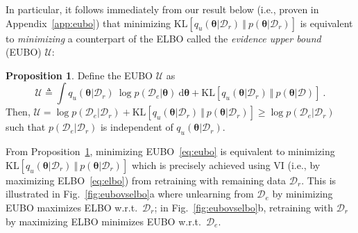 \documentclass{article}
\theoremstyle{definition}
\newtheorem{proposition}{Proposition}
\newcommand{\mbf}[1]{\mathbf{#1}}
\newcommand{\mcl}[1]{\mathcal{#1}}
\newcommand{\mbb}[1]{\mathbb{#1}}
\newcommand{\da}{\mcl{D}}
\newcommand{\dc}{\mcl{D}_r}
\newcommand{\dr}{\mcl{D}_e}
\begin{document}
In particular, it follows immediately from our result below (i.e., proven in Appendix~\ref{app:eubo}) that
minimizing $\text{KL}[q_u(\bm{\theta}|\dc)\ \Vert\ p(\bm{\theta}|\dc)]$ is equivalent to \emph{minimizing} a counterpart of the ELBO called the \emph{evidence upper bound} (EUBO) $\mcl{U}$:\vspace{1mm}
%
\begin{proposition}
\label{theo:eubo}
Define the EUBO $\mcl{U}$ as
%
\begin{equation}
\mcl{U} \triangleq \int q_u(\bm{\theta}|\dc)\ \log p(\dr|\bm{\theta})\ \text{d}\bm{\theta} + \text{KL}[q_u(\bm{\theta}|\dc)\ \Vert\ p(\bm{\theta}|\da)]\ .
\label{eq:eubo}
\end{equation}
%
Then, $\mcl{U} = \log p(\dr|\dc) + \text{KL}[q_u(\bm{\theta}|\dc)\ \Vert\ p(\bm{\theta}|\dc)] \ge \log p(\dr|\dc)$ such that $p(\dr|\dc)$ is independent of $q_u(\bm{\theta}|\dc)$. 
\end{proposition}
%
%
From Proposition~\ref{theo:eubo}, minimizing EUBO~\eqref{eq:eubo} is equivalent to minimizing $\text{KL}[q_u(\bm{\theta}|\dc)\ \Vert\ p(\bm{\theta}|\dc)]$
which is precisely achieved using VI (i.e., by maximizing ELBO~\eqref{eq:elbo}) from retraining with remaining data $\dc$.
This is illustrated in 
Fig.~\ref{fig:eubovselbo}a where unlearning from $\dr$ by minimizing EUBO maximizes ELBO w.r.t.~$\dc$; 
in Fig.~\ref{fig:eubovselbo}b, retraining with $\dc$ by maximizing ELBO minimizes EUBO w.r.t.~$\dr$.
\end{document}
